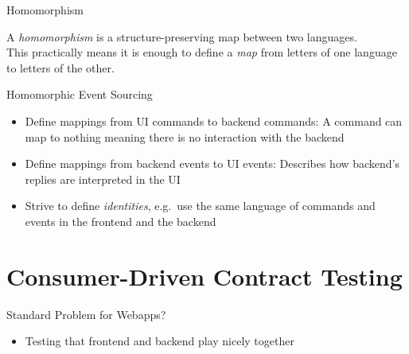 \begin{frame}[fragile]{Homomorphism}

  A \emph{homomorphism} is a structure-preserving map between two languages.
   \\[2em]

  This practically means it is enough to
  define a \emph{map} from letters of one language to letters of the other.

\end{frame}

\begin{frame}[fragile]{Homomorphic Event Sourcing}
  \begin{itemize}[<+->]
  \item Define mappings from UI commands to backend commands: A command
    can map to nothing meaning there is no interaction with
    the backend
  \item Define mappings from backend events to UI events: Describes how
    backend's replies are interpreted in the UI
  \item Strive to define \emph{identities}, e.g.~use the same language of commands and events in the frontend and the backend
  \end{itemize}
\end{frame}

\part{Consumer-Driven Contract Testing}

\begin{frame}[fragile]{Standard Problem for Webapps?}

\begin{itemize}
\item Testing that frontend and backend play nicely together
\end{itemize}

\end{frame}

